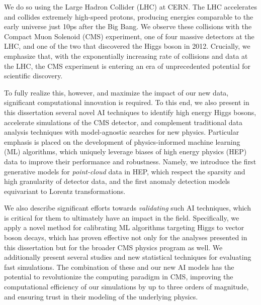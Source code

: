\begin{dissertationintroduction}
We do so using the Large Hadron Collider (LHC) at CERN. 
The LHC accelerates and collides extremely high-speed protons, producing energies comparable to the early universe just 10ps after the Big Bang.
We observe these collisions with the Compact Muon Solenoid (CMS) experiment, one of four massive detectors at the LHC, and one of the two that discovered the Higgs boson in 2012.
Crucially, we emphasize that, with the exponentially increasing rate of collisions and data at the LHC, the CMS experiment is entering an era of unprecedented potential for scientific discovery. 


To fully realize this, however, and maximize the impact of our new data, significant computational innovation is required. 
To this end, we also present in this dissertation several novel AI techniques to identify high energy Higgs bosons, accelerate simulations of the CMS detector, and complement traditional data analysis techniques with model-agnostic searches for new physics.
Particular emphasis is placed on the development of physics-informed machine learning (ML) algorithms, which uniquely leverage biases of high energy physics (HEP) data to improve their performance and robustness.
Namely, we introduce the first generative models for \textit{point-cloud} data in HEP, which respect the sparsity and high granularity of detector data, and the first anomaly detection models equivariant to Lorentz transformations.

We also describe significant efforts towards \textit{validating} such AI techniques, which is critical for them to ultimately have an impact in the field.
Specifically, we apply a novel method for calibrating ML algorithms targeting Higgs to vector boson decays, which has proven effective not only for the analyses presented in this dissertation but for the broader CMS physics program as well.
We additionally present several studies and new statistical techniques for evaluating fast simulations.
The combination of these and our new AI models has the potential to revolutionize the computing paradigm in CMS, improving the computational efficiency of our simulations by up to three orders of magnitude, and ensuring trust in their modeling of the underlying physics.



\end{dissertationintroduction}
